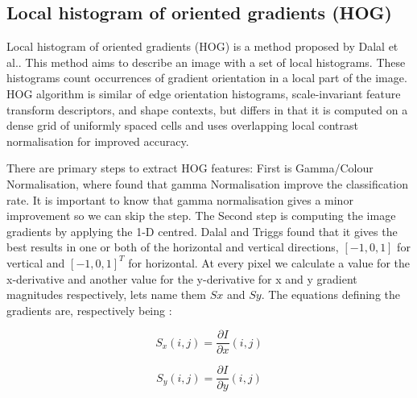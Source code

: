 
\subsection{Local histogram of oriented gradients (HOG)}

Local histogram of oriented gradients (HOG) is a method proposed by Dalal et al.\citep{dalal2005histograms}. This method aims to describe an image with a set of local histograms. These histograms count occurrences of gradient orientation in a local part of the image. HOG algorithm is similar of edge orientation histograms, scale-invariant feature transform descriptors, and shape contexts, but differs in that it is computed on a dense grid of uniformly spaced cells and uses overlapping local contrast normalisation for improved accuracy\citep{dalal2005histograms}.

There are primary steps to extract HOG features: First is Gamma/Colour Normalisation, where \citet{dalal2005histograms} found that gamma Normalisation improve the classification rate. It is important to know that gamma normalisation gives a minor improvement so we can skip the step. The Second step is computing the image gradients by applying the 1-D centred. Dalal and Triggs found that it gives the best results in one or both of the horizontal and vertical directions, $ [-1,0,1] $ for vertical  and $ [-1,0,1] ^T$ for horizontal.
At every pixel we calculate a value for the x-derivative and another value for the y-derivative for x and y gradient magnitudes respectively, lets name them $Sx$ and $Sy$. The equations defining the gradients are, respectively being :


\begin{equation}\label{eq:HOG1}
S_x (i,j) = \frac{\partial I}{\partial x} (i,j)
\end{equation}

\begin{equation}\label{eq:HOG2}
S_y (i,j) = \frac{\partial I}{\partial y} (i,j)
\end{equation}

